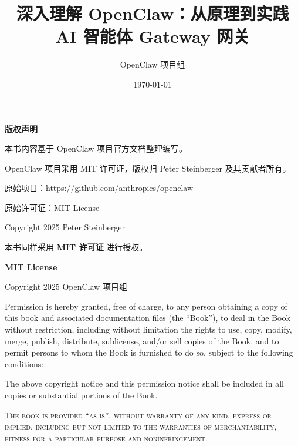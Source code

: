 \documentclass[twoside,10pt,openright]{book}
\title{
    \vspace{2cm}
{\Huge\textbf{深入理解 OpenClaw：从原理到实践}} \\
    \vspace{0.5cm}
    {\large AI 智能体 Gateway 网关}
    \vspace{2cm}
}
\author{OpenClaw 项目组}
\date{\today}
\renewcommand\large{\fontsize{10pt}{10pt}\selectfont}
\begin{document}
\maketitle
\thispagestyle{empty}

\clearpage
\thispagestyle{empty}
\vspace*{\fill}
\begin{center}
{\large\textbf{版权声明}}
\end{center}

\bigskip

\noindent 本书内容基于 OpenClaw 项目官方文档整理编写。

\medskip

\noindent OpenClaw 项目采用 MIT 许可证，版权归 Peter Steinberger 及其贡献者所有。

\medskip

\noindent 原始项目：\url{https://github.com/anthropics/openclaw}

\noindent 原始许可证：MIT License

\noindent Copyright \textcopyright{} 2025 Peter Steinberger

\bigskip

\noindent 本书同样采用 \textbf{MIT 许可证} 进行授权。

\bigskip

\noindent \textbf{MIT License}

\medskip

\noindent Copyright \textcopyright{} 2025 OpenClaw 项目组

\medskip

\noindent Permission is hereby granted, free of charge, to any person obtaining a copy
of this book and associated documentation files (the ``Book''), to deal
in the Book without restriction, including without limitation the rights
to use, copy, modify, merge, publish, distribute, sublicense, and/or sell
copies of the Book, and to permit persons to whom the Book is furnished to
do so, subject to the following conditions:

\medskip

\noindent The above copyright notice and this permission notice shall be included in all
copies or substantial portions of the Book.

\medskip

\noindent \textsc{The book is provided ``as is'', without warranty of any kind, express or
implied, including but not limited to the warranties of merchantability,
fitness for a particular purpose and noninfringement.}

\vspace*{\fill}

\frontmatter
\tableofcontents
\clearpage

\mainmatter











\end{document}
